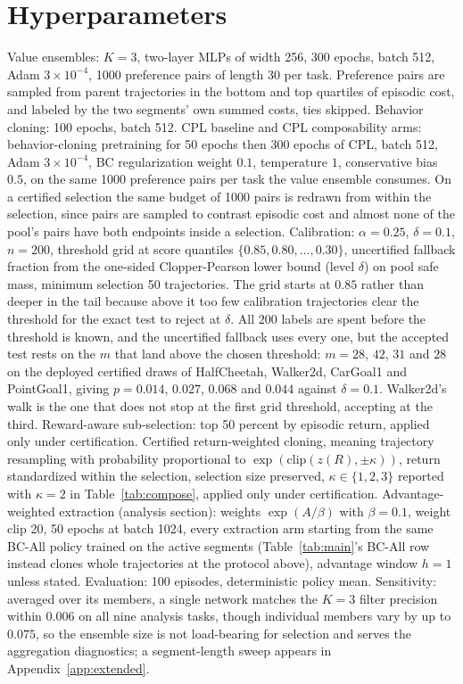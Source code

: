 \documentclass{article} %
\begin{document}
\section{Hyperparameters}
\label{app:hyper}
Value ensembles: $K = 3$, two-layer MLPs of width 256, 300 epochs, batch 512, Adam $3 \times 10^{-4}$, 1000 preference pairs of length 30 per task. Preference pairs are sampled from parent trajectories in the bottom and top quartiles of episodic cost, and labeled by the two segments' own summed costs, ties skipped. Behavior cloning: 100 epochs, batch 512. CPL baseline and CPL composability arms: behavior-cloning pretraining for 50 epochs then 300 epochs of CPL, batch 512, Adam $3 \times 10^{-4}$, BC regularization weight $0.1$, temperature $1$, conservative bias $0.5$, on the same 1000 preference pairs per task the value ensemble consumes. On a certified selection the same budget of 1000 pairs is redrawn from within the selection, since pairs are sampled to contrast episodic cost and almost none of the pool's pairs have both endpoints inside a selection. Calibration: $\alpha = 0.25$, $\delta = 0.1$, $n = 200$, threshold grid at score quantiles $\{0.85, 0.80, \dots, 0.30\}$, uncertified fallback fraction from the one-sided Clopper-Pearson lower bound (level $\delta$) on pool safe mass, minimum selection 50 trajectories. The grid starts at $0.85$ rather than deeper in the tail because above it too few calibration trajectories clear the threshold for the exact test to reject at $\delta$. All $200$ labels are spent before the threshold is known, and the uncertified fallback uses every one, but the accepted test rests on the $m$ that land above the chosen threshold: $m = 28$, $42$, $31$ and $28$ on the deployed certified draws of HalfCheetah, Walker2d, CarGoal1 and PointGoal1, giving $p = 0.014$, $0.027$, $0.068$ and $0.044$ against $\delta = 0.1$. Walker2d's walk is the one that does not stop at the first grid threshold, accepting at the third. Reward-aware sub-selection: top 50 percent by episodic return, applied only under certification. Certified return-weighted cloning, meaning trajectory resampling with probability proportional to $\exp(\mathrm{clip}(z(R), \pm \kappa))$, return standardized within the selection, selection size preserved, $\kappa \in \{1, 2, 3\}$ reported with $\kappa = 2$ in Table~\ref{tab:compose}, applied only under certification. Advantage-weighted extraction (analysis section): weights $\exp(A/\beta)$ with $\beta = 0.1$, weight clip 20, 50 epochs at batch 1024, every extraction arm starting from the same BC-All policy trained on the active segments (Table~\ref{tab:main}'s BC-All row instead clones whole trajectories at the protocol above), advantage window $h = 1$ unless stated. Evaluation: 100 episodes, deterministic policy mean. Sensitivity: averaged over its members, a single network matches the $K = 3$ filter precision within $0.006$ on all nine analysis tasks, though individual members vary by up to $0.075$, so the ensemble size is not load-bearing for selection and serves the aggregation diagnostics; a segment-length sweep appears in Appendix~\ref{app:extended}.
\end{document}

